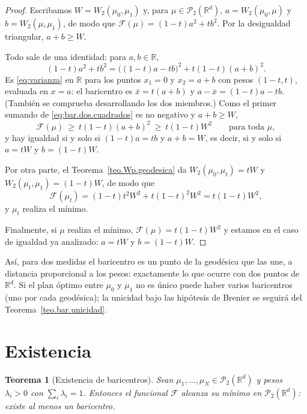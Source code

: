 \documentclass[12pt, a4paper]{amsbook}
\newcommand{\R}{{\mathbb R}}
\newtheorem{teo}{Teorema}[section]
\theoremstyle{remark}
\theoremstyle{definition}
\numberwithin{section}{chapter}
\numberwithin{subsection}{section}
\numberwithin{equation}{section}
\numberwithin{figure}{chapter}
\begin{document}
\begin{proof}
Escribamos $W=W_2(\mu_0,\mu_1)$ y, para $\mu\in\mathcal P_2(\R^d)$,
$a=W_2(\mu_0,\mu)$ y $b=W_2(\mu,\mu_1)$, de modo que
$\mathcal F(\mu)=(1-t)a^2+tb^2$. Por la desigualdad triangular, $a+b\ge W$.

Todo sale de una identidad: para $a,b\in\R$,
\begin{equation}\label{eq:bar.dos.cuadrados}
(1-t)a^2+tb^2=\bigl((1-t)a-tb\bigr)^2+t(1-t)(a+b)^2.
\end{equation}
Es \eqref{eq:varianza} en $\R$ para los puntos $x_1=0$ y $x_2=a+b$ con pesos
$(1-t,t)$, evaluada en $x=a$: el baricentro es $\bar x=t(a+b)$ y
$a-\bar x=(1-t)a-tb$. (También se comprueba desarrollando los dos miembros.)
Como el primer sumando de \eqref{eq:bar.dos.cuadrados} es no negativo y
$a+b\ge W$,
\[
\mathcal F(\mu)\ \ge\ t(1-t)(a+b)^2\ \ge\ t(1-t)W^2
\qquad\text{para toda }\mu,
\]
y hay igualdad si y solo si $(1-t)a=tb$ y $a+b=W$, es decir, si y solo si
$a=tW$ y $b=(1-t)W$.

Por otra parte, el Teorema~\ref{teo.Wp.geodesica} da
$W_2(\mu_0,\mu_t)=tW$ y $W_2(\mu_t,\mu_1)=(1-t)W$, de modo que
\[
\mathcal F(\mu_t)=(1-t)t^2W^2+t(1-t)^2W^2=t(1-t)W^2,
\]
y $\mu_t$ realiza el mínimo.

Finalmente, si $\mu$ realiza el mínimo, $\mathcal F(\mu)=t(1-t)W^2$ y
estamos en el caso de igualdad ya analizado: $a=tW$ y $b=(1-t)W$.
\end{proof}

Así, para dos medidas el baricentro es un punto de la geodésica que las une,
a distancia proporcional a los pesos: exactamente lo que ocurre con dos puntos
de $\R^d$. Si el plan óptimo entre $\mu_0$ y $\mu_1$ no es único puede haber
varios baricentros (uno por cada geodésica); la unicidad bajo las hipótesis
de Brenier se seguirá del Teorema~\ref{teo.bar.unicidad}.

\section{Existencia}\label{sec.bar.existencia}

\begin{teo}[Existencia de baricentros]\label{teo.bar.existencia}
Sean $\mu_1,\dots,\mu_N\in\mathcal P_2(\R^d)$ y pesos $\lambda_i>0$ con
$\sum_i\lambda_i=1$. Entonces el funcional $\mathcal F$ alcanza su mínimo en
$\mathcal P_2(\R^d)$: existe al menos un baricentro.
\end{teo}
\end{document}
